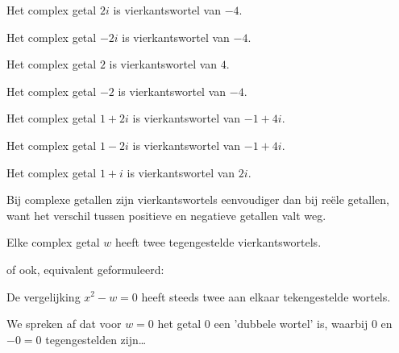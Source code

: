 \documentclass{ximera}
\begin{document}
    \begin{example}
        \begin{question} Het complex getal $2i$ is \choiceEen vierkantswortel van $-4$. \end{question}
        \begin{question} Het complex getal $-2i$ is \choiceEen vierkantswortel van $-4$. \end{question}
        \begin{question} Het complex getal $2$ is \choiceGeen vierkantswortel van $4$. \end{question}
        \begin{question} Het complex getal $-2$ is \choiceGeen vierkantswortel van $-4$. \end{question}
        \begin{question} Het complex getal $1+2i$ is \choiceEen vierkantswortel van $-1+4i$. \end{question}
        \begin{question} Het complex getal $1-2i$ is \choiceGeen vierkantswortel van $-1+4i$. \end{question}
        \begin{question} Het complex getal $1+i$ is \choiceEen vierkantswortel van $2i$. \end{question}
    \end{example}

    Bij complexe getallen zijn vierkantswortels eenvoudiger dan bij reële getallen, want het verschil tussen positieve en negatieve getallen valt weg.

    \begin{proposition}
        Elke complex getal $w$ heeft twee tegengestelde vierkantswortels.

        of ook, equivalent geformuleerd:
        {\centering

        De vergelijking $x^2-w = 0$ heeft steeds twee aan elkaar tekengestelde wortels.
        }
    \end{proposition}
    We spreken af dat voor $w=0$ het getal $0$ een 'dubbele wortel' is, waarbij $0$ en $-0=0$ tegengestelden zijn\ldots
\end{document}
